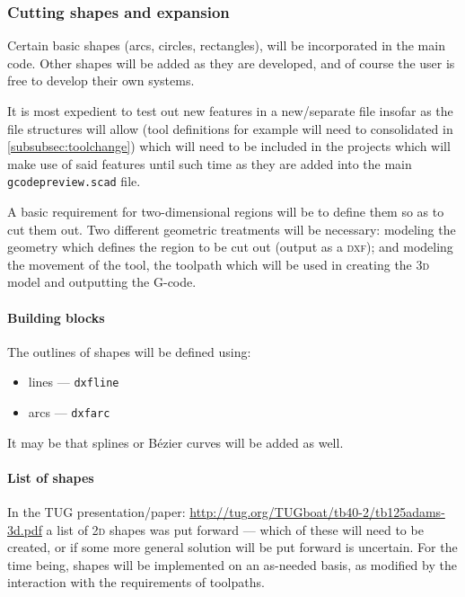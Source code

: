 \documentclass{ltxdoc}
\begin{document}
\subsubsection{Cutting shapes and expansion}

Certain basic shapes (arcs, circles, rectangles), will be incorporated in the main code. Other shapes will be added as they are developed, and of course the user is free to develop their own systems.

 
It is most expedient to test out new features in a new/separate file insofar as the file structures will allow (tool definitions for example will need to consolidated in \ref{subsubsec:toolchange}) which will need to be included in the projects which will make use of said features until such time as they are added into the main \texttt{gcodepreview.scad} file.

A basic requirement for two-dimensional regions will be to define them so as to cut them out. Two different geometric treatments will be necessary: modeling the geometry which defines the region to be cut out (output as a \textsc{dxf}); and modeling the movement of the tool, the toolpath which will be used in creating the \textsc{3d} model and outputting the G-code.

\paragraph{Building blocks}

The outlines of shapes will be defined using:

\begin{itemize}
\item lines --- \verb|dxfline|
\item arcs --- \verb|dxfarc|
\end{itemize}

It may be that splines or Bézier curves will be added as well.

\paragraph{List of shapes}

In the TUG presentation/paper: \url{http://tug.org/TUGboat/tb40-2/tb125adams-3d.pdf} a list of \textsc{2d} shapes was put forward --- which of these will need to be created, or if some more general solution will be put forward is uncertain. For the time being, shapes will be implemented on an as-needed basis, as modified by the interaction with the requirements of toolpaths.
\end{document}

